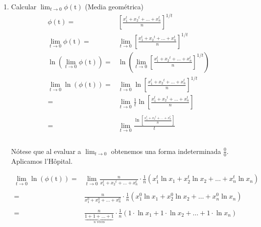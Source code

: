 \documentclass[a4paper,12pt]{article}
\begin{document}
\begin{enumerate}{}
    \item Calcular $\lim _{t \rightarrow 0} \phi(\mathrm{t})$ (Media geométrica)
        \[
        \begin{array}{rl}
            \phi(\mathrm{t}) = &  \displaystyle \left[\frac{x_{1}^{t}+x_{2}{ }^{t}+\ldots+x_{n}^{t}}{n}\right]^{1/t} \\
            \lim_{t\rightarrow 0} \phi(\mathrm{t}) =  & \lim_{t\rightarrow 0} \displaystyle \left[\frac{x_{1}^{t}+x_{2}{ }^{t}+\ldots+x_{n}^{t}}{n}\right]^{1/t} \\
            \ln (\lim_{t\rightarrow 0} \phi(\mathrm{t})) = & \ln\left(\lim_{t\rightarrow 0} \displaystyle \left[\frac{x_{1}^{t}+x_{2}{ }^{t}+\ldots+x_{n}^{t}}{n}\right]^{1/t}\right) \\
            \lim_{t\rightarrow 0} \ln (\phi(\mathrm{t})) = & \lim_{t\rightarrow 0} \displaystyle \ln\left[\frac{x_{1}^{t}+x_{2}{ }^{t}+\ldots+x_{n}^{t}}{n}\right]^{1/t}\\
            = & \lim_{t\rightarrow 0} \displaystyle\frac{1}{t}  \displaystyle \ln\left[\frac{x_{1}^{t}+x_{2}{ }^{t}+\ldots+x_{n}^{t}}{n}\right]\\\\
            = & \lim_{t\rightarrow 0}\displaystyle\frac{\displaystyle \ln\left[\frac{x_{1}^{t}+x_{2}{ }^{t}+\ldots+x_{n}^{t}}{n}\right]}{t}\\\\
        \end{array}
        \]
        \begin{center}
            Nótese que al evaluar a $\lim_{t\rightarrow 0}$ obtenemos una forma indeterminada $\displaystyle\frac{0}{0}$.\\
            Aplicamos l'Hôpital.
        \end{center}
        \[
        \begin{array}{rl}
            \lim_{t\rightarrow 0} \ln (\phi(\mathrm{t})) = &\lim_{t\rightarrow 0} \displaystyle \frac{n}{x_{1}^{t}+x_{2}{ }^{t}+\ldots+x_{n}^{t}} \cdot \displaystyle\frac{1}{n}\left( x_1^t\ln{x_1} + x_2^t\ln{x_2}+\ldots +x_n^t\ln{x_n} \right)\\ \\
             = & \displaystyle \frac{n}{x_{1}^{0}+x_{2}^{0}+\ldots+x_{n}^{0}} \cdot \displaystyle\frac{1}{n} \left(x_1^0\ln{x_1} + x_2^0\ln{x_2}+\ldots +x_n^0\ln{x_n}\right)\\ \\
             = & \displaystyle\frac{n}{\underbrace{1+1+\ldots +1}_{n\text{ veces}}} \cdot \displaystyle\frac{1}{n}\left( 1\cdot\ln{x_1} + 1\cdot\ln{x_2}+\ldots +1\cdot\ln{x_n} \right)\\ \\

\end{array}\]
\end{enumerate}
\end{document}
